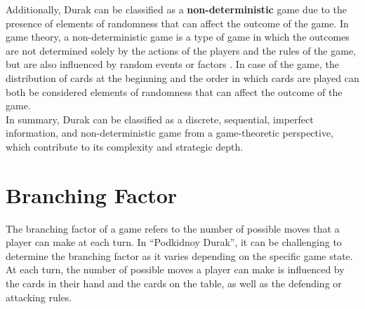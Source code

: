 Additionally, Durak can be classified as a \textbf{non-deterministic} game due to the presence of elements of randomness that can affect the outcome of the game. In game theory, a non-deterministic game is a type of game in which the outcomes are not determined solely by the actions of the players and the rules of the game, but are also influenced by random events or factors \citep{Gametheory4}. In case of the game, the distribution of cards at the beginning and the order in which cards are played can both be considered elements of randomness that can affect the outcome of the game. \\

In summary, Durak can be classified as a discrete, sequential, imperfect information, and non-deterministic game from a game-theoretic perspective, which contribute to its complexity and strategic depth.


\section{Branching Factor}

The branching factor of a game refers to the number of possible moves that a player can make at each turn. In ``Podkidnoy Durak'', it can be challenging to determine the branching factor as it varies depending on the specific game state. At each turn, the number of possible moves a player can make is influenced by the cards in their hand and the cards on the table, as well as the defending or attacking rules.